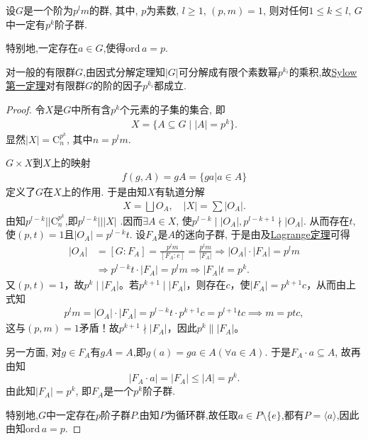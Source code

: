 \documentclass[../../main.tex]{subfiles}%
\begin{document}
\begin{theorem}\label{theorem:Sylow 第一定理}
设$G$是一个阶为$p^lm$的群, 其中, $p$为素数, $l\geqslant 1$, $(p,m)=1$, 则对任何$1\leqslant k\leqslant l$, $G$中一定有$p^k$阶子群.

特别地,一定存在$a\in G$,使得$\mathrm{ord}\,a = p$.
\end{theorem}
\begin{remark}
对一般的有限群$G$,由因式分解定理知$|G|$可分解成有限个素数幂$p^{k_i}$的乘积,故\hyperref[theorem:Sylow 第一定理]{Sylow 第一定理}对有限群$G$的阶的因子$p^{k_i}$都成立.
\end{remark}
\begin{proof}
令$X$是$G$中所有含$p^k$个元素的子集的集合, 即
\begin{align*}
X=\{A\subseteq G\mid |A|=p^k\}.
\end{align*}
显然$|X|=\mathrm{C}_n^{p^k}$, 其中$n=p^lm$.

$G\times X$到$X$上的映射
\begin{align*}
f(g,A)=gA=\{ga|a\in A\}
\end{align*}
定义了$G$在$X$上的作用. 于是由知$X$有轨道分解
\begin{align*}
X=\bigsqcup O_A, \quad |X|=\sum |O_A|.
\end{align*}
由知$p^{l-k}||\mathrm{C}_n^{p^k}$,即$p^{l-k}|||X|$ .因而$\exists A\in X$, 使$p^{l-k}\mid |O_A|,p^{l-k+1}\nmid |O_A|$. 从而存在$t$,使$(p,t)=1$且$|O_A|=p^{l-k}t$.
设$F_A$是$A$的迷向子群, 于是由及\hyperref[theorem:抽象代数--Lagrange定理]{Lagrange定理}可得
\begin{align*}
|O_A|&=[G:F_A]=\frac{p^lm}{[F_A:e]}=\frac{p^lm}{|F_A|}\Longrightarrow |O_A|\cdot |F_A|=p^lm
\\
&\Longrightarrow p^{l-k}t\cdot |F_A|=p^lm\Longrightarrow |F_A|t=p^k.
\end{align*}
又$(p,t)=1$，故$p^k\mid |F_A|$。若$p^{k+1}\mid |F_A|$，则存在$c$，使$|F_A|=p^{k+1}c$，从而由上式知
\begin{align*}
p^lm=|O_A|\cdot |F_A|=p^{l-k}t\cdot p^{k+1}c=p^{l+1}tc\implies m=ptc,
\end{align*}
这与$(p,m)=1$矛盾！故$p^{k+1}\nmid |F_A|$，因此$p^k\parallel |F_A|$。

另一方面, 对$g\in F_A$有$gA=A$,即$g(a)=ga\in A(\forall a\in A)$. 于是$F_A\cdot a\subseteq A$, 故再由知
$$
|F_A\cdot a|=|F_A|\leqslant |A|=p^k.
$$
由此知$|F_A|=p^k$, 即$F_A$是一个$p^k$阶子群.

特别地,$G$中一定存在$p$阶子群$P$.由知$P$为循环群,故任取$a\in P\setminus\{e\}$,都有$P = \langle a \rangle$,因此由知$\mathrm{ord}\,a = p$.
\end{proof}
\end{document}
